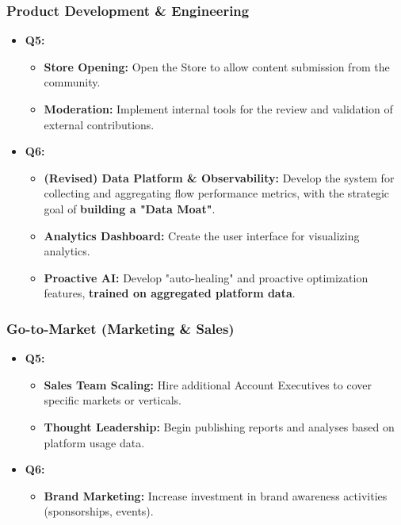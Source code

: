 \documentclass[11pt, a4paper, oneside]{article}
\begin{document}
\subsubsection*{Product Development \& Engineering}
\begin{itemize}[leftmargin=*]
    \item \textbf{Q5:}
    \begin{itemize}
        \item \textbf{Store Opening:} Open the Store to allow content submission from the community.
        \item \textbf{Moderation:} Implement internal tools for the review and validation of external contributions.
    \end{itemize}
    \item \textbf{Q6:}
    \begin{itemize}
        \item \textbf{(Revised) Data Platform \& Observability:} Develop the system for collecting and aggregating flow performance metrics, with the strategic goal of \textbf{building a "Data Moat"}.
        \item \textbf{Analytics Dashboard:} Create the user interface for visualizing analytics.
        \item \textbf{Proactive AI:} Develop "auto-healing" and proactive optimization features, \textbf{trained on aggregated platform data}.
    \end{itemize}
\end{itemize}

\subsubsection*{Go-to-Market (Marketing \& Sales)}
\begin{itemize}[leftmargin=*]
    \item \textbf{Q5:}
    \begin{itemize}
        \item \textbf{Sales Team Scaling:} Hire additional Account Executives to cover specific markets or verticals.
        \item \textbf{Thought Leadership:} Begin publishing reports and analyses based on platform usage data.
    \end{itemize}
    \item \textbf{Q6:}
    \begin{itemize}
        \item \textbf{Brand Marketing:} Increase investment in brand awareness activities (sponsorships, events).
    \end{itemize}
\end{itemize}
\end{document}

